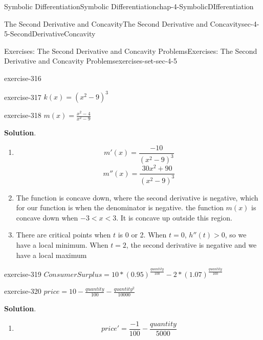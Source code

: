 \documentclass[oneside,10pt,]{book}
\numberwithin{equation}{section}
\newcommand{\lt}{<}
\newcommand{\gt}{>}
\begin{document}
\begin{chapterptx}{Symbolic Differentiation}{}{Symbolic Differentiation}{}{}{chap-4-SymbolicDIfferentiation}
\begin{sectionptx}{The Second Derivative and Concavity}{}{The Second Derivative and Concavity}{}{}{sec-4-5-SecondDerivativeConcavity}
\begin{exercises-subsection-numberless}{Exercises: The Second Derivative and Concavity Problems}{}{Exercises: The Second Derivative and Concavity Problems}{}{}{exercises-set-sec-4-5}
\begin{exercisegroup}
\begin{divisionexerciseeg}{3}{}{}{exercise-316}
\begin{enumerate}[label=(\alph*)]
\end{enumerate}
\end{divisionexerciseeg}%
\begin{divisionexerciseeg}{4}{}{}{exercise-317}%
\hypertarget{p-1831}{}%
\(k(x)=(x^2-9)^3\)%
\end{divisionexerciseeg}%
\begin{divisionexerciseeg}{5}{}{}{exercise-318}%
\hypertarget{p-1832}{}%
\(m(x)=\frac{x^2-4}{x^2-9}\)%
\par\smallskip%
\noindent\textbf{Solution}.\hypertarget{solution-159}{}\quad%
\leavevmode%
\begin{enumerate}[label=(\alph*)]
\item\hypertarget{li-549}{}%
\begin{equation*}
m' (x)=\frac{-10}{(x^2-9)^3}
\end{equation*}
%
\begin{equation*}
m'' (x)=\frac{30x^2+90}{(x^2-9)^3}
\end{equation*}
%
\item\hypertarget{li-550}{}\hypertarget{p-1833}{}%
The function is concave down, where the second derivative is negative, which for our function is when the denominator is negative.  the function \(m(x)\) is concave down when \(-3 \lt x \lt 3\).  It is concave up outside this region.%
\item\hypertarget{li-551}{}\hypertarget{p-1834}{}%
There are critical points when \(t\) is 0 or 2.  When \(t=0\), \(h''(t)\gt 0\), so we have a local minimum.  When \(t=2\), the second derivative is negative and we have a local maximum%
\end{enumerate}
\end{divisionexerciseeg}%
\begin{divisionexerciseeg}{6}{}{}{exercise-319}%
\hypertarget{p-1835}{}%
\(ConsumerSurplus= 10*(0.95)^
{\frac{quantity}{100}}- 2*(1.07)^{\frac{quantity}{100}}\)%
\end{divisionexerciseeg}%
\begin{divisionexerciseeg}{7}{}{}{exercise-320}%
\hypertarget{p-1836}{}%
\(price= 10-\frac{quantity}{100}- \frac{quantity^2}{10000}\)%
\par\smallskip%
\noindent\textbf{Solution}.\hypertarget{solution-160}{}\quad%
\leavevmode%
\begin{enumerate}[label=(\alph*)]
\item\hypertarget{li-552}{}%
\begin{equation*}
price'=\frac{-1}{100}-\frac{quantity}{5000}
\end{equation*}

\end{enumerate}
\end{divisionexerciseeg}
\end{exercisegroup}
\end{exercises-subsection-numberless}
\end{sectionptx}
\end{chapterptx}
\end{document}
